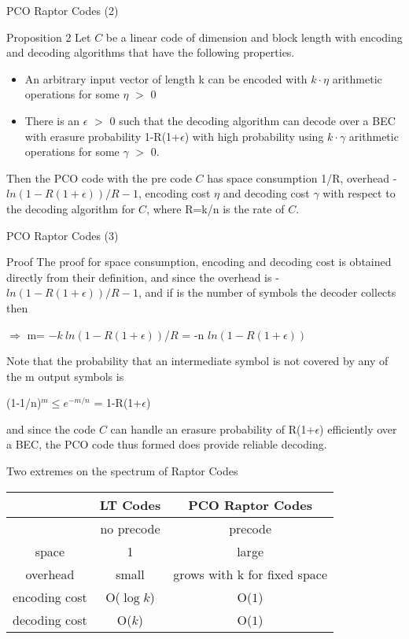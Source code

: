 \documentclass[handout,11pt]{beamer}
\begin{document}
\begin{frame}{PCO Raptor Codes (2)}
\begin{block}{Proposition 2}
Let $C$ be a linear code of dimension and block length with encoding and decoding algorithms that have the following properties.
\begin{itemize}
\item An arbitrary input vector of length k can be encoded with $k\cdot \eta$
arithmetic operations for some $\eta$ $>$ 0
\pause
\item There is an $\epsilon$ $>$ 0 such that the decoding algorithm can
decode over a BEC with erasure probability 1-R(1+$\epsilon$)
with high probability using $k\cdot \gamma$ arithmetic operations for
some $\gamma$ $>$ 0.
\end{itemize}
\pause
Then the PCO code with the pre code $C$ has space consumption 1/R, overhead -$ln(1-R(1+\epsilon))/R -1$, encoding cost $\eta$ and decoding cost $\gamma$ with respect to the decoding algorithm for $C$, where R=k/n is the rate of $C$.

\end{block}

\end{frame}
\begin{frame}{PCO Raptor Codes (3)}
\begin{block}{Proof}
The proof for space consumption, encoding and decoding cost is obtained directly from their definition, and since the overhead is -$ln(1-R(1+\epsilon))/R -1$, and if is the number of symbols the decoder collects then

$\Rightarrow$ m= $-k\ ln(1-R(1+\epsilon))$/$R$ = -n $ln(1-R(1+\epsilon))$
 
 Note that the probability that an intermediate symbol is not covered by any of the m output symbols is 
 
 (1-1/n)$^m\le e^{-m/n}$ = 1-R(1+$\epsilon$)
 
 and since the code $C$ can handle an erasure probability of R(1+$\epsilon$) efficiently over a BEC, the PCO code thus formed does provide reliable decoding.  
\end{block}
\end{frame}

\begin{frame}{Two extremes on the spectrum of Raptor Codes}
\begin{table}[]
    \centering
    \begin{tabular}{c|c|c}
        & LT Codes & PCO Raptor Codes\\
        \hline
         & no precode & precode \\
         space & 1 & large \\
         overhead & small & grows with k for fixed space \\
         encoding cost & O($\log k$) & O($1$)\\
         decoding cost & O($k$) & O($1$)
    \end{tabular}
    \label{tab:my_label}
\end{table}
\end{frame}
\end{document}
